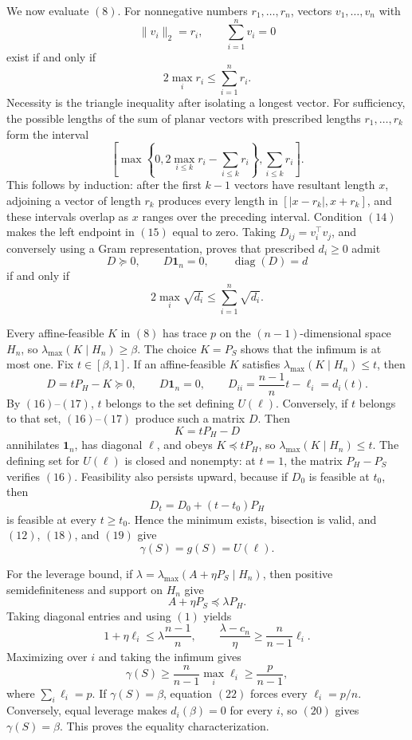 We now evaluate \((8)\). For nonnegative numbers \(r_1,\ldots,r_n\), vectors \(v_1,\ldots,v_n\) with
\[
\|v_i\|_2=r_i,
\qquad
\sum_{i=1}^n v_i=0
\tag{13}
\]
exist if and only if
\[
2\max_i r_i\leq\sum_{i=1}^n r_i.
\tag{14}
\]
Necessity is the triangle inequality after isolating a longest vector. For sufficiency, the possible lengths of the sum of planar vectors with prescribed lengths \(r_1,\ldots,r_k\) form the interval
\[
\left[
\max\left\{0,2\max_{i\leq k}r_i-\sum_{i\leq k}r_i\right\},
\sum_{i\leq k}r_i
\right].
\tag{15}
\]
This follows by induction: after the first \(k-1\) vectors have resultant length \(x\), adjoining a vector of length \(r_k\) produces every length in \([|x-r_k|,x+r_k]\), and these intervals overlap as \(x\) ranges over the preceding interval. Condition \((14)\) makes the left endpoint in \((15)\) equal to zero. Taking \(D_{ij}=v_i^\top v_j\), and conversely using a Gram representation, proves that prescribed \(d_i\geq0\) admit
\[
D\succeq0,
\qquad
D\mathbf1_n=0,
\qquad
\operatorname{diag}(D)=d
\tag{16}
\]
if and only if
\[
2\max_i\sqrt{d_i}\leq\sum_{i=1}^n\sqrt{d_i}.
\tag{17}
\]

Every affine-feasible \(K\) in \((8)\) has trace \(p\) on the \((n-1)\)-dimensional space \(H_n\), so \(\lambda_{\max}(K\mid H_n)\geq\beta\). The choice \(K=P_S\) shows that the infimum is at most one. Fix \(t\in[\beta,1]\). If an affine-feasible \(K\) satisfies \(\lambda_{\max}(K\mid H_n)\leq t\), then
\[
D=tP_H-K\succeq0,
\qquad
D\mathbf1_n=0,
\qquad
D_{ii}=\frac{n-1}{n}t-\ell_i=d_i(t).
\tag{18}
\]
By \((16)\)--\((17)\), \(t\) belongs to the set defining \(U(\ell)\). Conversely, if \(t\) belongs to that set, \((16)\)--\((17)\) produce such a matrix \(D\). Then
\[
K=tP_H-D
\tag{19}
\]
annihilates \(\mathbf1_n\), has diagonal \(\ell\), and obeys \(K\preceq tP_H\), so \(\lambda_{\max}(K\mid H_n)\leq t\). The defining set for \(U(\ell)\) is closed and nonempty: at \(t=1\), the matrix \(P_H-P_S\) verifies \((16)\). Feasibility also persists upward, because if \(D_0\) is feasible at \(t_0\), then
\[
D_t=D_0+(t-t_0)P_H
\]
is feasible at every \(t\geq t_0\). Hence the minimum exists, bisection is valid, and \((12)\), \((18)\), and \((19)\) give
\[
\gamma(S)=g(S)=U(\ell).
\tag{20}
\]

For the leverage bound, if \(\lambda=\lambda_{\max}(A+\eta P_S\mid H_n)\), then positive semidefiniteness and support on \(H_n\) give
\[
A+\eta P_S\preceq\lambda P_H.
\]
Taking diagonal entries and using \((1)\) yields
\[
1+\eta\ell_i\leq\lambda\frac{n-1}{n},
\qquad
\frac{\lambda-c_n}{\eta}\geq\frac{n}{n-1}\ell_i.
\tag{21}
\]
Maximizing over \(i\) and taking the infimum gives
\[
\gamma(S)\geq\frac{n}{n-1}\max_i\ell_i
\geq\frac{p}{n-1},
\tag{22}
\]
where \(\sum_i\ell_i=p\). If \(\gamma(S)=\beta\), equation \((22)\) forces every \(\ell_i=p/n\). Conversely, equal leverage makes \(d_i(\beta)=0\) for every \(i\), so \((20)\) gives \(\gamma(S)=\beta\). This proves the equality characterization.

